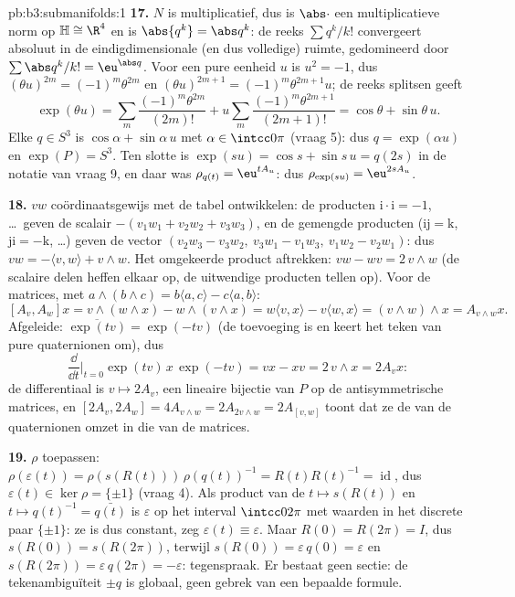 \begin{solution}{pb:b3:submanifolds:1}
\textbf{17.} $N$ is multiplicatief, dus is $\abs\cdot$ een
multiplicatieve norm op $\mathbb H \cong \R^4$ en is $\abs{q^k} =
\abs q^k$: de reeks $\sum q^k/k!$ convergeert absoluut in de
eindigdimensionale (en dus volledige) ruimte, gedomineerd door
$\sum\abs q^k/k! = \eu^{\abs q}$. Voor een pure eenheid $u$ is
$u^2 = -1$, dus $(\theta u)^{2m} = (-1)^m\theta^{2m}$ en $(\theta
u)^{2m+1} = (-1)^m\theta^{2m+1}u$; de reeks splitsen geeft
\[
\exp(\theta u) = \sum_m\frac{(-1)^m\theta^{2m}}{(2m)!} +
u\sum_m\frac{(-1)^m\theta^{2m+1}}{(2m+1)!} = \cos\theta +
\sin\theta\,u .
\]
Elke $q \in S^3$ is $\cos\alpha + \sin\alpha\,u$ met $\alpha \in
\intcc0\pi$ (vraag 5): dus $q = \exp(\alpha u)$ en $\exp(P) =
S^3$. Ten slotte is $\exp(su) = \cos s + \sin s\,u = q(2s)$ in de
notatie van vraag 9, en daar was $\rho_{q(t)} = \eu^{tA_u}$: dus
$\rho_{\exp(su)} = \eu^{2sA_u}$.

\textbf{18.} $vw$ coördinaatsgewijs met de tabel ontwikkelen: de
producten $\mathrm i\cdot\mathrm i = -1$, \dots\ geven de
scalair $-(v_1w_1 + v_2w_2 + v_3w_3)$, en de gemengde producten
($\mathrm{ij} = \mathrm k$, $\mathrm{ji} = -\mathrm k$, \dots)
geven de vector $(v_2w_3 - v_3w_2,\ v_3w_1 - v_1w_3,\ v_1w_2 -
v_2w_1)$: dus $vw = -\langle v, w\rangle + v\wedge w$. Het
omgekeerde product aftrekken: $vw - wv = 2\,v\wedge w$ (de
scalaire delen heffen elkaar op, de uitwendige producten tellen
op). Voor de matrices, met $a\wedge(b\wedge c) = b\langle a,
c\rangle - c\langle a, b\rangle$:
\[
[A_v, A_w]x = v\wedge(w\wedge x) - w\wedge(v\wedge x)
= w\langle v, x\rangle - v\langle w, x\rangle
= (v\wedge w)\wedge x = A_{v\wedge w}x .
\]
Afgeleide: $\overline{\exp(tv)} = \exp(-tv)$ (de toevoeging is
 en keert het teken van pure quaternionen om), dus
\[
\frac{\dd}{\dd t}\Bigr|_{t=0}\exp(tv)\,x\,\exp(-tv) = vx -
xv = 2\,v\wedge x = 2A_vx :
\]
de differentiaal is $v \mapsto 2A_v$, een lineaire bijectie van
$P$ op de antisymmetrische matrices, en $[2A_v, 2A_w] =
4A_{v\wedge w} = 2A_{2v\wedge w} = 2A_{[v,w]}$ toont dat ze de
 van de quaternionen omzet in die van de matrices.

\textbf{19.} $\rho$ toepassen: $\rho(\varepsilon(t)) =
\rho(s(R(t)))\,\rho(q(t))^{-1} = R(t)R(t)^{-1} =
\operatorname{id}$, dus $\varepsilon(t) \in \ker\rho = \{\pm1\}$
(vraag 4). Als product van de  $t \mapsto
s(R(t))$ en $t \mapsto q(t)^{-1} = \bar{q(t)}$ is $\varepsilon$
 op het  interval $\intcc0{2\pi}$ met waarden
in het discrete paar $\{\pm1\}$: ze is dus constant, zeg
$\varepsilon(t) \equiv \varepsilon$. Maar $R(0) = R(2\pi) = I$,
dus $s(R(0)) = s(R(2\pi))$, terwijl $s(R(0)) = \varepsilon\,q(0)
= \varepsilon$ en $s(R(2\pi)) = \varepsilon\,q(2\pi) =
-\varepsilon$: tegenspraak. Er bestaat geen  sectie: de
tekenambiguïteit $\pm q$ is globaal, geen gebrek van een
bepaalde formule.


\end{solution}
